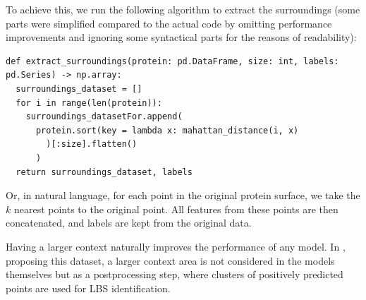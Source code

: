 To achieve this, we run the following algorithm to extract the surroundings (some parts were simplified compared to the actual code by omitting performance improvements and ignoring some syntactical parts for the reasons of readability):

\begin{lstlisting}
def extract_surroundings(protein: pd.DataFrame, size: int, labels: pd.Series) -> np.array:
  surroundings_dataset = []
  for i in range(len(protein)):
    surroundings_datasetFor.append(
      protein.sort(key = lambda x: mahattan_distance(i, x)
        )[:size].flatten()
      )
  return surroundings_dataset, labels
\end{lstlisting}

Or, in natural language, for each point in the original protein surface, we take the $k$ nearest points to the original point. All features from these points are then concatenated, and labels are kept from the original data.

Having a larger context naturally improves the performance of any model. In \cite{P2RANK}, proposing this dataset, a larger context area is not considered in the models themselves but as a postprocessing step, where clusters of positively predicted points are used for LBS identification.
